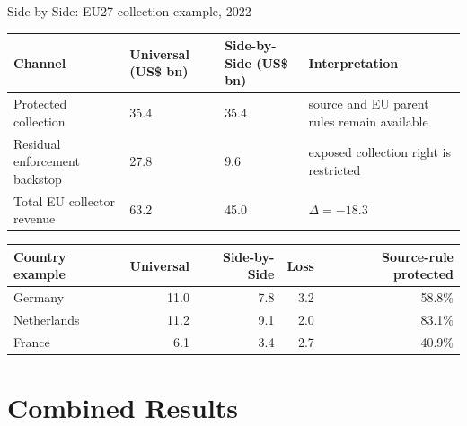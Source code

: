 \documentclass[aspectratio=169, 11pt]{beamer}
\begin{document}
\begin{frame}{Side-by-Side: EU27 collection example, 2022}
\small
\begin{center}
\scriptsize
\setlength{\tabcolsep}{4pt}
\begin{tabular}{@{}L{3.05cm}C{2.15cm}C{2.25cm}L{3.45cm}@{}}
  \toprule
  Channel & Universal (US\$ bn) & Side-by-Side (US\$ bn) & Interpretation \\
  \midrule
  Protected collection & 35.4 & 35.4 & source and EU parent rules remain available \\
  Residual enforcement backstop & 27.8 & 9.6 & exposed collection right is restricted \\
  \midrule
  Total EU collector revenue & 63.2 & 45.0 & \(\Delta = -18.3\) \\
  \bottomrule
\end{tabular}
\end{center}

\vspace{0.22em}
\begin{center}
\scriptsize
\begin{tabular}{@{}lrrrr@{}}
  \toprule
  Country example & Universal & Side-by-Side & Loss & Source-rule protected \\
  \midrule
  Germany & 11.0 & 7.8 & 3.2 & 58.8\% \\
  Netherlands & 11.2 & 9.1 & 2.0 & 83.1\% \\
  France & 6.1 & 3.4 & 2.7 & 40.9\% \\
  \bottomrule
\end{tabular}
\end{center}
\end{frame}

\section{Combined Results}
\end{document}
